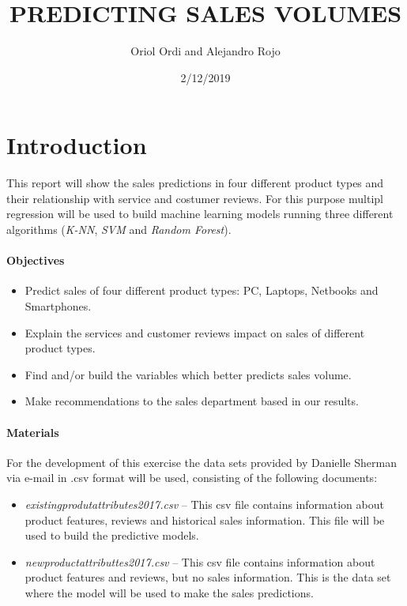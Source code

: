 \documentclass[]{article}
\title{PREDICTING SALES VOLUMES}
\author{Oriol Ordi and Alejandro Rojo}
\date{2/12/2019}
\providecommand{\tightlist}{%
  \setlength{\itemsep}{0pt}\setlength{\parskip}{0pt}}
\let\oldparagraph\paragraph
\renewcommand{\paragraph}[1]{\oldparagraph{#1}\mbox{}}
\begin{document}
\maketitle

\hypertarget{introduction}{%
\section{Introduction}\label{introduction}}

This report will show the sales predictions in four different product
types and their relationship with service and costumer reviews. For this
purpose multipl regression will be used to build machine learning models
running three different algorithms (\emph{K-NN}, \emph{SVM} and
\emph{Random Forest}).

\hypertarget{objectives}{%
\paragraph{Objectives}\label{objectives}}

\begin{itemize}
\tightlist
\item
  Predict sales of four different product types: PC, Laptops, Netbooks
  and Smartphones.
\item
  Explain the services and customer reviews impact on sales of different
  product types.
\item
  Find and/or build the variables which better predicts sales volume.
\item
  Make recommendations to the sales department based in our results.
\end{itemize}

\hypertarget{materials}{%
\paragraph{Materials}\label{materials}}

For the development of this exercise the data sets provided by Danielle
Sherman via e-mail in .csv format will be used, consisting of the
following documents:

\begin{itemize}
\item
  \emph{existingprodutattributes2017.csv} -- This csv file contains
  information about product features, reviews and historical sales
  information. This file will be used to build the predictive models.
\item
  \emph{newproductattributtes2017.csv} -- This csv file contains
  information about product features and reviews, but no sales
  information. This is the data set where the model will be used to make
  the sales predictions.
\end{itemize}
\end{document}
